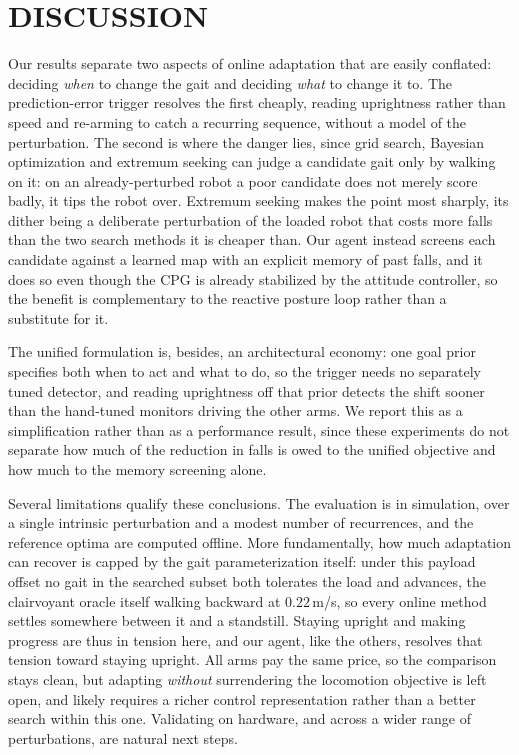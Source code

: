\documentclass[letterpaper, 10 pt, conference]{ieeeconf}  %
\begin{document}
\section{DISCUSSION}
\label{sec:discussion}

Our results separate two aspects of online adaptation that are easily conflated: deciding \emph{when} to change the gait and deciding \emph{what} to change it to.
The prediction-error trigger resolves the first cheaply, reading uprightness rather than speed and re-arming to catch a recurring sequence, without a model of the perturbation.
The second is where the danger lies, since grid search, Bayesian optimization and extremum seeking can judge a candidate gait only by walking on it: on an already-perturbed robot a poor candidate does not merely score badly, it tips the robot over.
Extremum seeking makes the point most sharply, its dither being a deliberate perturbation of the loaded robot that costs more falls than the two search methods it is cheaper than.
Our agent instead screens each candidate against a learned map with an explicit memory of past falls, and it does so even though the CPG is already stabilized by the attitude controller, so the benefit is complementary to the reactive posture loop rather than a substitute for it.

The unified formulation is, besides, an architectural economy: one goal prior specifies both when to act and what to do, so the trigger needs no separately tuned detector, and reading uprightness off that prior detects the shift sooner than the hand-tuned monitors driving the other arms.
We report this as a simplification rather than as a performance result, since these experiments do not separate how much of the reduction in falls is owed to the unified objective and how much to the memory screening alone.

Several limitations qualify these conclusions.
The evaluation is in simulation, over a single intrinsic perturbation and a modest number of recurrences, and the reference optima are computed offline.
More fundamentally, how much adaptation can recover is capped by the gait parameterization itself: under this payload offset no gait in the searched subset both tolerates the load and advances, the clairvoyant oracle itself walking backward at $0.22$\,m/s, so every online method settles somewhere between it and a standstill.
Staying upright and making progress are thus in tension here, and our agent, like the others, resolves that tension toward staying upright.
All arms pay the same price, so the comparison stays clean, but adapting \emph{without} surrendering the locomotion objective is left open, and likely requires a richer control representation rather than a better search within this one.
Validating on hardware, and across a wider range of perturbations, are natural next steps.
\end{document}
